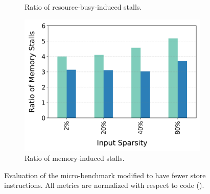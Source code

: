 \begin{figure}[t]
\begin{subfigure}{.33\textwidth}
    \caption{Ratio of resource-busy-induced stalls.}
    \label{fig:if-then-else-few-scatter-resource}
  \end{subfigure}%
  \begin{subfigure}{.33\textwidth}
        \centering
    \includegraphics[width=\textwidth]{Figures/Evaluations/if_then_else_few_scatter_mem_stalls.png}
    \caption{Ratio of memory-induced stalls.}
    \label{fig:if-then-else-few-scatter-mem-stalls}
  \end{subfigure}%
  \caption{Evaluation of the \ifElseBench micro-benchmark modified to have fewer store instructions. All metrics are normalized with respect to \ifconverted code (\ifconv).}
\end{figure}



